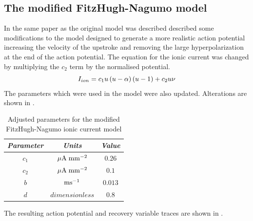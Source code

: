 \subsection{The modified FitzHugh-Nagumo model}
\label{The_modified_FitzHugh-Nagumo_Model}
In the same paper as the original model was described \citet{rogers:1994a} described
some modifications to the model designed to generate a more realistic action
potential increasing the velocity of the upstroke and removing the large
hyperpolarization at the end of the action potential. The equation for the
ionic current was changed by multiplying the $c_2$ term by the normalised
potential. 
\begin{equation}
  I_{ion} = c_1 u \left( u - \alpha \right) \left( u - 1 \right) + c_2 u \nu
  \label{eqn:mod_FHN_excitation_equation}
\end{equation}
The parameters which were used in the model were also updated. Alterations are
shown in .
\begin{table}[hbtp] \centering
  \begin{tabular}{|c|c|c|}
    \hline
    \emph{Parameter} & \emph{Units} & \emph{Value} \\ 
    \hline
    \hline 
    $c_1$ & $\mathrm{\mu A}\thickspace\mathrm{mm}^{-2}$ & $0.26$ \\
    $c_2$ & $\mathrm{\mu A}\thickspace\mathrm{mm}^{-2}$ & $0.1$ \\
    $b$ & $\mathrm{\mathrm{ms}^{-1}}$ & $0.013$ \\
    $d$ & $dimensionless$ & $0.8$ \\
    \hline
  \end{tabular}
  \caption[Adjusted parameters for the modified FitzHugh-Nagumo ionic current
  model]{Adjusted parameters for the modified FitzHugh-Nagumo ionic current model}
  \label{tab:mod_FitzHugh-Nagumo_Model_Params}
\end{table}
The resulting action potential and recovery variable traces are shown in
.
